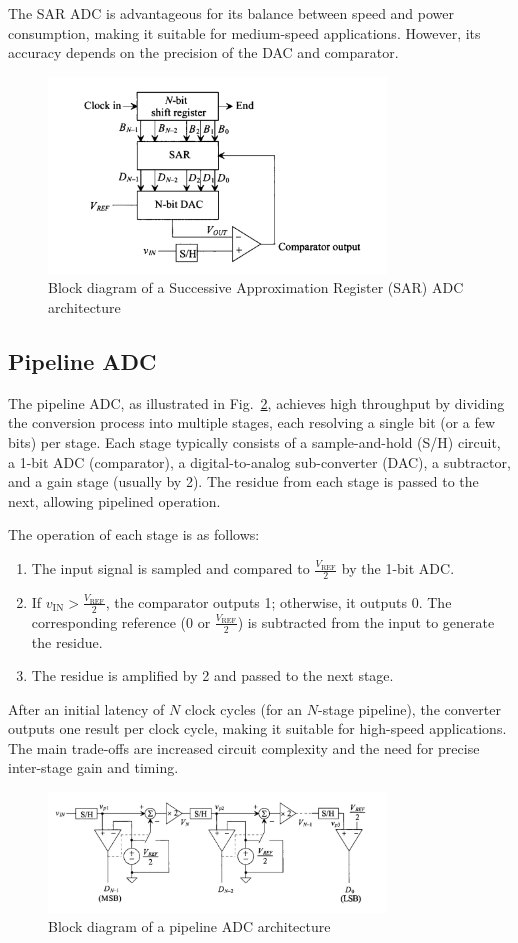 The SAR ADC is advantageous for its balance between speed and power consumption, making it suitable for medium-speed applications. However, its accuracy depends on the precision of the DAC and comparator.

\begin{figure}[H]
	\centering
	\includegraphics[width=0.8\textwidth]{figs/sar_adc.png}
	\caption{Block diagram of a Successive Approximation Register (SAR) ADC architecture}
	\label{fig:sar_adc}
	\vspace{0.5cm}
\end{figure}
\subsection{Pipeline ADC}
The pipeline ADC, as illustrated in Fig.~\ref{fig:pipeline_adc}, achieves high throughput by dividing the conversion process into multiple stages, each resolving a single bit (or a few bits) per stage. Each stage typically consists of a sample-and-hold (S/H) circuit, a 1-bit ADC (comparator), a digital-to-analog sub-converter (DAC), a subtractor, and a gain stage (usually by 2). The residue from each stage is passed to the next, allowing pipelined operation.

The operation of each stage is as follows:
\begin{enumerate}
	\item The input signal is sampled and compared to $\frac{V_{\text{REF}}}{2}$ by the 1-bit ADC.
	\item If $v_{\text{IN}} > \frac{V_{\text{REF}}}{2}$, the comparator outputs 1; otherwise, it outputs 0. The corresponding reference ($0$ or $\frac{V_{\text{REF}}}{2}$) is subtracted from the input to generate the residue.
	\item The residue is amplified by 2 and passed to the next stage.
\end{enumerate}

After an initial latency of $N$ clock cycles (for an $N$-stage pipeline), the converter outputs one result per clock cycle, making it suitable for high-speed applications. The main trade-offs are increased circuit complexity and the need for precise inter-stage gain and timing.

\begin{figure}[H]
	\centering
	\includegraphics[width=0.8\textwidth]{figs/pipeline_adc.png}
	\caption{Block diagram of a pipeline ADC architecture}
	\label{fig:pipeline_adc}
	\vspace{0.5cm}
\end{figure}
